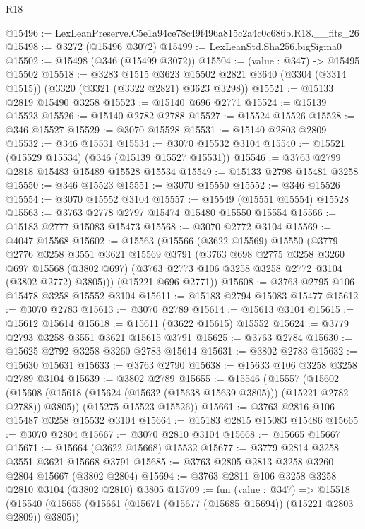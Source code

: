 \begin{lexlean}{R18}
\begin{coremodule}
@15496 := LexLeanPreserve.C5e1a94ce78c49f496a815c2a4c0c686b.R18.__fits_26
@15498 := @3272 (@15496 @3072)
@15499 := LexLeanStd.Sha256.bigSigma0
@15502 := @15498 (@346 (@15499 @3072))
@15504 := (value : @347) -> @15495 @15502
@15518 := @3283
    @1515
    @3623
    @15502
    @2821
    @3640
    (@3304 (@3314 @1515))
    (@3320 (@3321 (@3322 @2821) @3623 @3298))
@15521 := @15133 @2819 @15490 @3258
@15523 := @15140 @696 @2771
@15524 := @15139 @15523
@15526 := @15140 @2782 @2788
@15527 := @15524 @15526
@15528 := @346 @15527
@15529 := @3070 @15528
@15531 := @15140 @2803 @2809
@15532 := @346 @15531
@15534 := @3070 @15532 @3104
@15540 := @15521 (@15529 @15534) (@346 (@15139 @15527 @15531))
@15546 := @3763 @2799 @2818 @15483 @15489 @15528 @15534
@15549 := @15133 @2798 @15481 @3258
@15550 := @346 @15523
@15551 := @3070 @15550
@15552 := @346 @15526
@15554 := @3070 @15552 @3104
@15557 := @15549 (@15551 @15554) @15528
@15563 := @3763 @2778 @2797 @15474 @15480 @15550 @15554
@15566 := @15183 @2777 @15083 @15473
@15568 := @3070 @2772 @3104
@15569 := @4047 @15568
@15602 := @15563
    (@15566
      (@3622 @15569)
      @15550
      (@3779
        @2776
        @3258
        @3551
        @3621
        @15569
        @3791
        (@3763
          @698
          @2775
          @3258
          @3260
          @697
          @15568
          (@3802 @697)
          (@3763 @2773 @106 @3258 @3258 @2772 @3104 (@3802 @2772) @3805)))
      (@15221 @696 @2771))
@15608 := @3763 @2795 @106 @15478 @3258 @15552 @3104
@15611 := @15183 @2794 @15083 @15477
@15612 := @3070 @2783
@15613 := @3070 @2789
@15614 := @15613 @3104
@15615 := @15612 @15614
@15618 := @15611 (@3622 @15615) @15552
@15624 := @3779 @2793 @3258 @3551 @3621 @15615 @3791
@15625 := @3763 @2784
@15630 := @15625 @2792 @3258 @3260 @2783 @15614
@15631 := @3802 @2783
@15632 := @15630 @15631
@15633 := @3763 @2790
@15638 := @15633 @106 @3258 @3258 @2789 @3104
@15639 := @3802 @2789
@15655 := @15546
    (@15557
      (@15602 (@15608 (@15618 (@15624 (@15632 (@15638 @15639 @3805))) (@15221 @2782 @2788)) @3805))
      (@15275 @15523 @15526))
@15661 := @3763 @2816 @106 @15487 @3258 @15532 @3104
@15664 := @15183 @2815 @15083 @15486
@15665 := @3070 @2804
@15667 := @3070 @2810 @3104
@15668 := @15665 @15667
@15671 := @15664 (@3622 @15668) @15532
@15677 := @3779 @2814 @3258 @3551 @3621 @15668 @3791
@15685 := @3763 @2805 @2813 @3258 @3260 @2804 @15667 (@3802 @2804)
@15694 := @3763 @2811 @106 @3258 @3258 @2810 @3104 (@3802 @2810) @3805
@15709 := fun (value : @347) =>
  @15518
    (@15540
      (@15655 (@15661 (@15671 (@15677 (@15685 @15694)) (@15221 @2803 @2809)) @3805))

\end{coremodule}
\end{lexlean}
